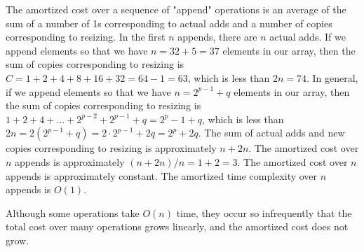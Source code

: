 \documentclass{article}
\begin{document}
The amortized cost over a sequence of "append" operations is an average of the sum of a number of 1s corresponding to actual adds and a number of copies corresponding to resizing. In the first $n$ appends, there are $n$ actual adds. If we append elements so that we have $n = 32 + 5 = 37$ elements in our array, then the sum of copies corresponding to resizing is $C = 1 + 2 + 4 + 8 + 16 + 32 = 64 - 1 = 63$, which is less than $2n = 74$. In general, if we append elements so that we have $n = 2^{p-1} + q$ elements in our array, then the sum of copies corresponding to resizing is $1 + 2 + 4 + ... + 2^{p-2} + 2^{p-1} + q = 2^{p} - 1 + q$, which is less than $2n = 2 \left(2^{p-1} + q\right) = 2 \cdot 2^{p-1} + 2 q = 2^p + 2q$. The sum of actual adds and new copies corresponding to resizing is approximately $n + 2n$. The amortized cost over $n$ appends is approximately $(n + 2n) / n = 1 + 2 = 3$. The amortized cost over $n$ appends is approximately constant. The amortized time complexity over $n$ appends is $O(1)$.

Although some operations take $O(n)$ time, they occur so infrequently that the total cost over many operations grows linearly, and the amortized cost does not grow.
\end{document}
